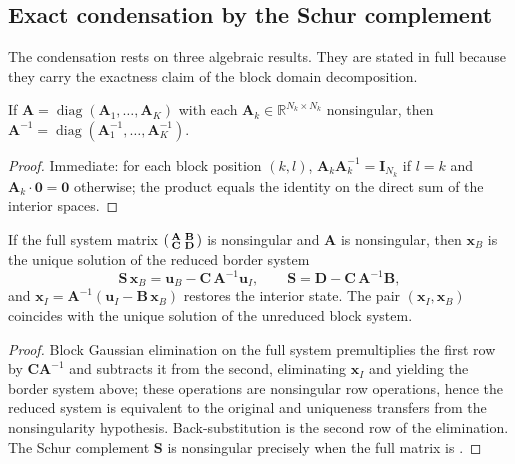 \subsection{Exact condensation by the Schur complement}
\label{sub:schur}

The condensation rests on three algebraic results. They are stated in full because they carry the exactness claim of the block domain decomposition.

\begin{lemma}
\label{lem:blockdiag}
If $\mathbf{A} = \operatorname{diag}(\mathbf{A}_1, \dots, \mathbf{A}_K)$ with each $\mathbf{A}_k \in \mathbb{R}^{N_k \times N_k}$ nonsingular, then $\mathbf{A}^{-1} = \operatorname{diag}(\mathbf{A}_1^{-1}, \dots, \mathbf{A}_K^{-1})$.
\end{lemma}
\begin{proof}
Immediate: for each block position $(k, l)$, $\mathbf{A}_k \mathbf{A}_k^{-1} = \mathbf{I}_{N_k}$ if $l = k$ and $\mathbf{A}_k \cdot \mathbf{0} = \mathbf{0}$ otherwise; the product equals the identity on the direct sum of the interior spaces.
\end{proof}

\begin{theorem}
\label{thm:schur}
If the full system matrix $\begin{psmallmatrix} \mathbf{A} & \mathbf{B} \\ \mathbf{C} & \mathbf{D} \end{psmallmatrix}$ is nonsingular and $\mathbf{A}$ is nonsingular, then $\mathbf{x}_B$ is the unique solution of the reduced border system
\begin{equation}
\mathbf{S}\, \mathbf{x}_B = \mathbf{u}_B - \mathbf{C}\, \mathbf{A}^{-1} \mathbf{u}_I, \qquad \mathbf{S} = \mathbf{D} - \mathbf{C}\, \mathbf{A}^{-1} \mathbf{B},
\label{eq:schur}
\end{equation}
and $\mathbf{x}_I = \mathbf{A}^{-1}(\mathbf{u}_I - \mathbf{B}\, \mathbf{x}_B)$ restores the interior state. The pair $(\mathbf{x}_I, \mathbf{x}_B)$ coincides with the unique solution of the unreduced block system.
\end{theorem}
\begin{proof}
Block Gaussian elimination on the full system premultiplies the first row by $\mathbf{C}\mathbf{A}^{-1}$ and subtracts it from the second, eliminating $\mathbf{x}_I$ and yielding the border system above; these operations are nonsingular row operations, hence the reduced system is equivalent to the original and uniqueness transfers from the nonsingularity hypothesis. Back-substitution is the second row of the elimination. The Schur complement $\mathbf{S}$ is nonsingular precisely when the full matrix is \cite{zhang2005}.
\end{proof}

